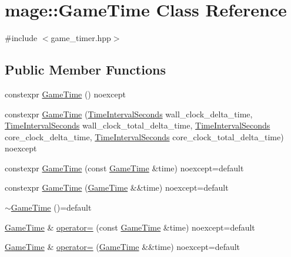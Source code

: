 \hypertarget{classmage_1_1_game_time}{}\section{mage\+:\+:Game\+Time Class Reference}
\label{classmage_1_1_game_time}


{\ttfamily \#include $<$game\+\_\+timer.\+hpp$>$}

\subsection*{Public Member Functions}
\begin{DoxyCompactItemize}
\item 
constexpr \mbox{\hyperlink{classmage_1_1_game_time_af39a4fbd42467249874ba9372f463552}{Game\+Time}} () noexcept
\item 
constexpr \mbox{\hyperlink{classmage_1_1_game_time_a1a5b31bbb76199507b17217099c796d4}{Game\+Time}} (\mbox{\hyperlink{namespacemage_a21c3d1575018d1e0720948713c76be1f}{Time\+Interval\+Seconds}} wall\+\_\+clock\+\_\+delta\+\_\+time, \mbox{\hyperlink{namespacemage_a21c3d1575018d1e0720948713c76be1f}{Time\+Interval\+Seconds}} wall\+\_\+clock\+\_\+total\+\_\+delta\+\_\+time, \mbox{\hyperlink{namespacemage_a21c3d1575018d1e0720948713c76be1f}{Time\+Interval\+Seconds}} core\+\_\+clock\+\_\+delta\+\_\+time, \mbox{\hyperlink{namespacemage_a21c3d1575018d1e0720948713c76be1f}{Time\+Interval\+Seconds}} core\+\_\+clock\+\_\+total\+\_\+delta\+\_\+time) noexcept
\item 
constexpr \mbox{\hyperlink{classmage_1_1_game_time_a7af065c229b72b1daa5a8f6cc6553ede}{Game\+Time}} (const \mbox{\hyperlink{classmage_1_1_game_time}{Game\+Time}} \&time) noexcept=default
\item 
constexpr \mbox{\hyperlink{classmage_1_1_game_time_a87dd026fe0c83aee86c39e4c40e641fb}{Game\+Time}} (\mbox{\hyperlink{classmage_1_1_game_time}{Game\+Time}} \&\&time) noexcept=default
\item 
\mbox{\hyperlink{classmage_1_1_game_time_ae7a709bde27a737be9ebed2a92e00c8b}{$\sim$\+Game\+Time}} ()=default
\item 
\mbox{\hyperlink{classmage_1_1_game_time}{Game\+Time}} \& \mbox{\hyperlink{classmage_1_1_game_time_ad589f54fb952e59b30e43e9ebc39ccee}{operator=}} (const \mbox{\hyperlink{classmage_1_1_game_time}{Game\+Time}} \&time) noexcept=default
\item 
\mbox{\hyperlink{classmage_1_1_game_time}{Game\+Time}} \& \mbox{\hyperlink{classmage_1_1_game_time_a6e22ba110f678044b00eb29f6f86451c}{operator=}} (\mbox{\hyperlink{classmage_1_1_game_time}{Game\+Time}} \&\&time) noexcept=default

\end{DoxyCompactItemize}
